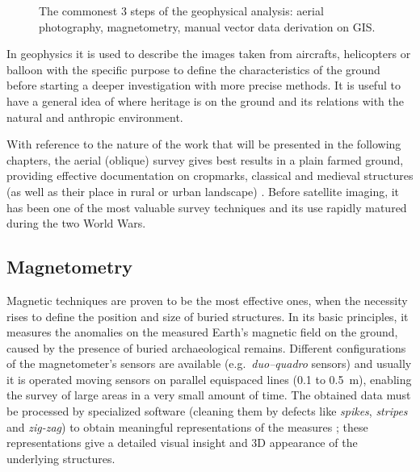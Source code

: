             \begin{wrapfigure}{l}{0.4\textwidth}
                \centering
                \vspace{-0.02\textheight}
                
                \caption[The commontest 3 steps of the geophysical analysis.]{The commonest 3 steps of the geophysical analysis: aerial photography, magnetometry, manual vector data derivation on GIS.}
                \label{fig:magn-circles}
                \vspace{-0.14\textheight}
            \end{wrapfigure}

            In geophysics it is used to describe the images taken from aircrafts, helicopters or balloon with the specific purpose to define the characteristics of the ground before starting a deeper investigation with more precise methods.
            It is useful to have a general idea of where heritage is on the ground and its relations with the natural and anthropic environment.

            With reference to the nature of the work that will be presented in the following chapters, the aerial (oblique) survey gives best results in a plain farmed ground, providing effective documentation on cropmarks, classical and medieval structures (as well as their place in rural or urban landscape) \cite[pp.~11--12]{arch-site-detection}. Before satellite imaging, it has been one of the most valuable survey techniques and its use rapidly matured during the two World Wars.
            
        \subsection{Magnetometry}
            Magnetic techniques are proven to be the most effective ones, when the necessity rises to define the position and size of buried structures. In its basic principles, it measures the anomalies on the measured Earth's magnetic field on the ground, caused by the presence of buried archaeological remains. Different configurations of the magnetometer's sensors are available (e.g.\ \emph{duo--quadro} sensors) and usually it is operated moving sensors on parallel equispaced lines (\num{0.1} to \SI{0.5}{\meter}), enabling the survey of large areas in a very small amount of time. The obtained data must be processed by specialized software (cleaning them by defects like \emph{spikes}, \emph{stripes} and \emph{zig-zag}) to obtain meaningful representations of the measures \cite[p.~462]{terrestrial-remote}; these representations give a detailed visual insight and 3D appearance of the underlying structures.

